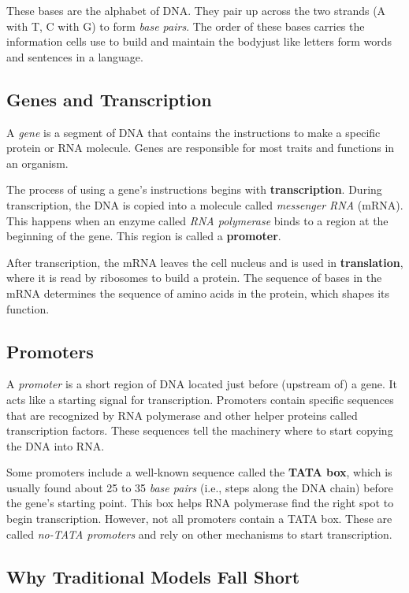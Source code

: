 These bases are the alphabet of DNA. They pair up across the two strands (A with T, C with G) to form \textit{base pairs}. The order of these bases carries the information cells use to build and maintain the body\textemdash just like letters form words and sentences in a language.

\subsection{Genes and Transcription}

A \textit{gene} is a segment of DNA that contains the instructions to make a specific protein or RNA molecule. Genes are responsible for most traits and functions in an organism.

The process of using a gene's instructions begins with \textbf{transcription}. During transcription, the DNA is copied into a molecule called \textit{messenger RNA} (mRNA). This happens when an enzyme called \textit{RNA polymerase} binds to a region at the beginning of the gene. This region is called a \textbf{promoter}.

After transcription, the mRNA leaves the cell nucleus and is used in \textbf{translation}, where it is read by ribosomes to build a protein. The sequence of bases in the mRNA determines the sequence of amino acids in the protein, which shapes its function.

\subsection{Promoters}

A \textit{promoter} is a short region of DNA located just before (upstream of) a gene. It acts like a starting signal for transcription. Promoters contain specific sequences that are recognized by RNA polymerase and other helper proteins called transcription factors. These sequences tell the machinery where to start copying the DNA into RNA.

Some promoters include a well-known sequence called the \textbf{TATA box}, which is usually found about 25 to 35 \textit{base pairs} (i.e., steps along the DNA chain) before the gene's starting point. This box helps RNA polymerase find the right spot to begin transcription. However, not all promoters contain a TATA box. These are called \textit{no-TATA promoters} and rely on other mechanisms to start transcription.

\subsection{Why Traditional Models Fall Short}

